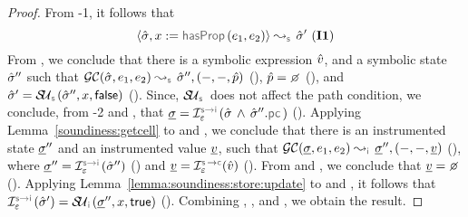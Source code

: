 \begin{proof}
\noindent {}
From \hyp{1}, it follows that 
$$\absbsemrule{\sstate, \jvar := \hasfield(\jsilexpr_1, \jsilexpr_2)}{\sstate'}{\symbolic} \text{ (\ieq{1})}$$
From , we conclude that there is a symbolic expression $\hat{v}$, and a symbolic state $\hat{\sigma}''$ such that 
$\absgetcellrule{\symbolic}{\sstate, \jsilexpr_1, \jsilexpr_2}{\sstate'', (-, -, \sexprp)}$ (), $\sexprp = \none$ (), 
and $\sstate' = \stupdt{\symbolic}(\sstate'', \jvar, \jfalse)$ (). 
Since, $\stupdt{\symbolic}$ does not affect the path condition, we conclude, from \hyp{2} and , that
$\istate = \interpret{\symbinst}{\senv}(\sstate \, \wedge \, \sstate''.\pcsel)$ ().
Applying Lemma~\ref{soundiness:getcell} to  and , we conclude that
there is an instrumented state $\underline{\sigma}''$ and an instrumented value $\underline{v}$, such that 
$\absgetcellrule{\instrumented}{\istate, \jsilexpr_1, \jsilexpr_2}{\istate'', (-, -, \ival)}$ (), 
where $\istate'' = \interpret{\symbinst}{\senv}(\sstate'')$ () and $\ival = \interpret{\symbconc}{\senv}(\sexprv)$ (). 
 From  and , we conclude that $\ival = \none$ (). 
Applying Lemma~\ref{lemma:soundiness:store:update} to  and , it follows
that  $\interpret{\symbinst}{\senv}(\sstate') = \stupdt{\instrumented}(\istate'', \jvar, \jtrue)$ ().
Combining , , and , we obtain the result. 
%
\end{proof}

